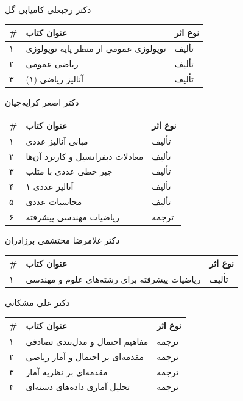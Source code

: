 \documentclass[
  letterpaper,
  DIV=11,
  numbers=noendperiod]{scrreprt}
\newcounter{none} %
\begin{document}
دکتر رجبعلی کامیابی گل

{\def\LTcaptype{none} %
\begin{longtable}[]{@{}lll@{}}
\toprule\noalign{}
\# & عنوان کتاب & نوع اثر \\
\midrule\noalign{}
\endhead
\bottomrule\noalign{}
\endlastfoot
۱ & توپولوژی عمومی از منظر پایه توپولوژی & تألیف \\
۲ & ریاضی عمومی & تألیف \\
۳ & آنالیز ریاضی (۱) & تألیف \\
\end{longtable}
}

دکتر اصغر کرایه‌چیان

{\def\LTcaptype{none} %
\begin{longtable}[]{@{}lll@{}}
\toprule\noalign{}
\# & عنوان کتاب & نوع اثر \\
\midrule\noalign{}
\endhead
\bottomrule\noalign{}
\endlastfoot
۱ & مبانی آنالیز عددی & تألیف \\
۲ & معادلات دیفرانسیل و کاربرد آن‌ها & تألیف \\
۳ & جبر خطی عددی با متلب & تألیف \\
۴ & آنالیز عددی ۱ & تألیف \\
۵ & محاسبات عددی & تألیف \\
۶ & ریاضیات مهندسی پیشرفته & ترجمه \\
\end{longtable}
}

دکتر غلامرضا محتشمی برزادران

{\def\LTcaptype{none} %
\begin{longtable}[]{@{}lll@{}}
\toprule\noalign{}
\# & عنوان کتاب & نوع اثر \\
\midrule\noalign{}
\endhead
\bottomrule\noalign{}
\endlastfoot
۱ & ریاضیات پیشرفته برای رشته‌های علوم و مهندسی & تألیف \\
\end{longtable}
}

دکتر علی مشکانی

{\def\LTcaptype{none} %
\begin{longtable}[]{@{}lll@{}}
\toprule\noalign{}
\# & عنوان کتاب & نوع اثر \\
\midrule\noalign{}
\endhead
\bottomrule\noalign{}
\endlastfoot
۱ & مفاهیم احتمال و مدل‌بندی تصادفی & ترجمه \\
۲ & مقدمه‌ای بر احتمال و آمار ریاضی & ترجمه \\
۳ & مقدمه‌ای بر نظریه آمار & ترجمه \\
۴ & تحلیل آماری داده‌های دسته‌ای & ترجمه \\
\end{longtable}
}
\end{document}

